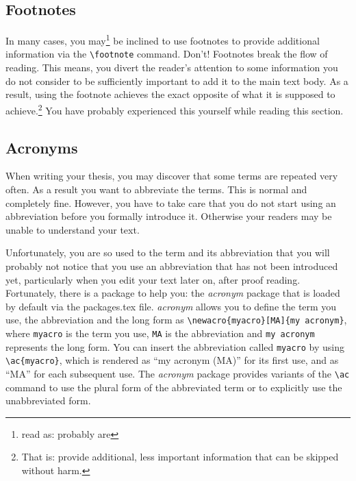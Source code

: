 \subsection{Footnotes}
\label{sec:guide:style:footnotes}
In many cases, you may\footnote{read as: probably are} be inclined to use
footnotes to provide additional information via the \verb+\footnote+ command.
Don't! 
Footnotes break the flow of reading.
This means, you divert the reader's attention to some information you do not
consider to be sufficiently important to add it to the main text body.
As a result, using the footnote achieves the exact opposite of what it is
supposed to achieve.\footnote{That is: provide additional, less important
information that can be skipped without harm.}
You have probably experienced this yourself while reading this section.



\subsection{Acronyms}
\label{sec:guide:style:acronyms}
When writing your thesis, you may discover that some terms are repeated very
often.
As a result you want to abbreviate the terms.
This is normal and completely fine.
However, you have to take care that you do not start using an abbreviation
before you formally introduce it.
Otherwise your readers may be unable to understand your text.

Unfortunately, you are so used to the term and its abbreviation that you will
probably not notice that you use an abbreviation that has not been introduced
yet, particularly when you edit your text later on, \eg{} after proof reading.
Fortunately, there is a package to help you: the \emph{acronym} package that is
loaded by default via the \mbox{packages.tex} file.
\emph{acronym} allows you to define the term you use, the abbreviation and the
long form as \verb+\newacro{myacro}[MA]{my acronym}+,
where \verb+myacro+ is the term you use, \verb+MA+ is the abbreviation and
\verb+my acronym+ represents the long form.
You can insert the abbreviation called \verb+myacro+ by using
\verb+\ac{myacro}+, which is rendered as ``my acronym (MA)'' for its first
use, and as ``MA'' for each subsequent use.
The \emph{acronym} package provides variants of the \verb+\ac+ command to use
the plural form of the abbreviated term or to explicitly use the unabbreviated
form.

